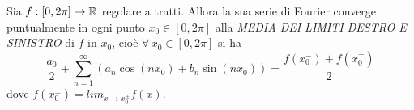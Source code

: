 \begin{theorem}
    Sia $f:[0, 2\pi] \to \mathbb{R}$ regolare a tratti. Allora la sua serie di Fourier converge puntualmente in ogni punto $x_0 \in [0, 2\pi]$ alla \emph{MEDIA DEI LIMITI DESTRO E SINISTRO} di $f$ in $x_0$, cioè $\forall \, x_0 \in [0, 2\pi]$ si ha
    \begin{equation}
        \frac{a_0}{2} + \sum_{n=1}^\infty (a_n \cos(nx_0) + b_n \sin(nx_0)) = \frac{f(x_0^-) + f(x_0^+)}{2}
    \end{equation}
    dove $f(x_0^\pm) = lim_{x \to x_0^\pm} f(x)$.
\end{theorem}